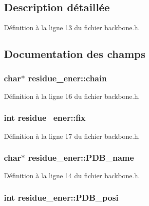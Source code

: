 \subsection{Description détaillée}


Définition à la ligne 13 du fichier backbone.\+h.



\subsection{Documentation des champs}
\hypertarget{structresidue__ener_a348a18ae3886f0d0cc5a4e7ce5ca5609}{
\subsubsection[{chain}]{\setlength{\rightskip}{0pt plus 5cm}char$\ast$ residue\+\_\+ener\+::chain}}\label{structresidue__ener_a348a18ae3886f0d0cc5a4e7ce5ca5609}


Définition à la ligne 16 du fichier backbone.\+h.

\hypertarget{structresidue__ener_a54b07491f3ee48a3b93fc9bbe9e64e51}{
\subsubsection[{fix}]{\setlength{\rightskip}{0pt plus 5cm}int residue\+\_\+ener\+::fix}}\label{structresidue__ener_a54b07491f3ee48a3b93fc9bbe9e64e51}


Définition à la ligne 17 du fichier backbone.\+h.

\hypertarget{structresidue__ener_a7e85379b061364b7f493461007527e04}{
\subsubsection[{P\+D\+B\+\_\+name}]{\setlength{\rightskip}{0pt plus 5cm}char$\ast$ residue\+\_\+ener\+::\+P\+D\+B\+\_\+name}}\label{structresidue__ener_a7e85379b061364b7f493461007527e04}


Définition à la ligne 14 du fichier backbone.\+h.

\hypertarget{structresidue__ener_a4f3b73824bf80117bce4dd2accd0275d}{
\subsubsection[{P\+D\+B\+\_\+posi}]{\setlength{\rightskip}{0pt plus 5cm}int residue\+\_\+ener\+::\+P\+D\+B\+\_\+posi}}\label{structresidue__ener_a4f3b73824bf80117bce4dd2accd0275d}


